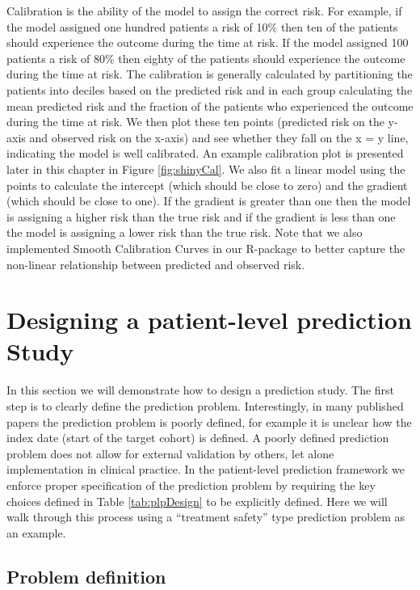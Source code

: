 \documentclass[11pt]{book}
\theoremstyle{definition}
\theoremstyle{definition}
\theoremstyle{definition}
\theoremstyle{remark}
\begin{document}
Calibration is the ability of the model to assign the correct risk. For example, if the model assigned one hundred patients a risk of 10\% then ten of the patients should experience the outcome during the time at risk. If the model assigned 100 patients a risk of 80\% then eighty of the patients should experience the outcome during the time at risk. The calibration is generally calculated by partitioning the patients into deciles based on the predicted risk and in each group calculating the mean predicted risk and the fraction of the patients who experienced the outcome during the time at risk. We then plot these ten points (predicted risk on the y-axis and observed risk on the x-axis) and see whether they fall on the x = y line, indicating the model is well calibrated. An example calibration plot is presented later in this chapter in Figure \ref{fig:shinyCal}. We also fit a linear model using the points to calculate the intercept (which should be close to zero) and the gradient (which should be close to one). If the gradient is greater than one then the model is assigning a higher risk than the true risk and if the gradient is less than one the model is assigning a lower risk than the true risk. Note that we also implemented Smooth Calibration Curves in our R-package to better capture the non-linear relationship between predicted and observed risk. 

\hypertarget{designing-a-patient-level-prediction-study}{%
\section{Designing a patient-level prediction Study}\label{designing-a-patient-level-prediction-study}}

In this section we will demonstrate how to design a prediction study. The first step is to clearly define the prediction problem. Interestingly, in many published papers the prediction problem is poorly defined, for example it is unclear how the index date (start of the target cohort) is defined. A poorly defined prediction problem does not allow for external validation by others, let alone implementation in clinical practice. In the patient-level prediction framework we enforce proper specification of the prediction problem by requiring the key choices defined in Table \ref{tab:plpDesign} to be explicitly defined. Here we will walk through this process using a ``treatment safety'' type prediction problem as an example. 

\hypertarget{problem-definition-2}{%
\subsection{Problem definition}\label{problem-definition-2}}
\end{document}
